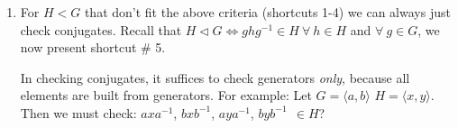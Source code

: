 \begin{enumerate}
    \begin{align}
        \text{Define } &\sigma:H\rightarrow gHg^{-1} \nonumber \\
        &\sigma(h)=ghg^{-1} \nonumber
    \end{align}
    To show $\sigma$ is a bijection we'll show $\sigma^{-1}$ exists (L 1.2.3).
    \begin{align}
        \text{Define } \mu:gHg^{-1} \rightarrow H \nonumber \\
        \mu(ghg^{-1})=g^{-1}(ghg^{-1})g =h \nonumber
    \end{align}
    operations make $\mu$ well-defined. Now we will show $\mu=\sigma^{-1}$.
    \begin{align}
        (\mu \circ \sigma)(h)=\mu(\sigma(h))=\mu(ghg^{-1})=h\nonumber \\
        \text{so }(\mu\circ \sigma)=I_H\nonumber \nonumber \\
        (\sigma\circ \mu)(ghg^{-1})=\sigma(\mu(ghg^{-1}))=\sigma(h)=ghg^{-1} \nonumber\\
        \text{so }(\sigma \circ \mu )=I_{gHg^{-1}}\nonumber
    \end{align}
    $\therefore \ \mu=\sigma^{-1}$ so $\sigma$ is a bijection.\\
    So there is a one-to-one correspondence between $gHg^{-1}$ and $H$ so $o(gHg^{-1})=o(H)$. But
    $H$ is the only subgroup of $o(H)$, $\therefore gHg^{-1}=H$.
    \item For $H<G$ that don't fit the above criteria (shortcuts 1-4) we can always just check
    conjugates. Recall that $H\triangleleft G \iff ghg^{-1} \in H \ \forall \ h \in H$ and
    $\forall \ g \in G$, we now present shortcut \# 5. \steezybreak

    \noindent In checking conjugates, it suffices to check generators \textit{only}, because all
    elements are built from generators. For example: Let $G=\langle a,b \rangle$
    $H= \langle x,y \rangle$. Then we must check: $axa^{-1}$, $bxb^{-1}$, $aya^{-1}$,
    $byb^{-1} \ \ \in H$? \steezybreak


\end{enumerate}
